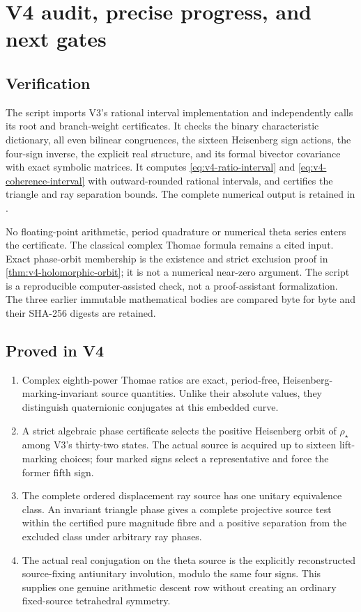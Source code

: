 \documentclass[11pt]{article}
\theoremstyle{definition}
\theoremstyle{remark}
\begin{document}
\section{V4 audit, precise progress, and next gates}
\label{sec:v4-status}

\subsection{Verification}
The script 
imports V3's rational interval implementation and independently calls its
root and branch-weight certificates. It checks the binary characteristic
dictionary, all even bilinear congruences, the sixteen Heisenberg sign
actions, the four-sign inverse, the explicit real structure, and its
formal bivector covariance with exact symbolic matrices. It computes
\eqref{eq:v4-ratio-interval} and \eqref{eq:v4-coherence-interval} with
outward-rounded rational intervals, and certifies the triangle and ray
separation bounds. The complete numerical output is retained in
.

No floating-point arithmetic, period quadrature or numerical theta series
enters the certificate. The classical complex Thomae formula remains a
cited input. Exact phase-orbit membership is the existence and strict
exclusion proof in \cref{thm:v4-holomorphic-orbit}; it is not a numerical
near-zero argument. The script is a reproducible computer-assisted check,
not a proof-assistant formalization. The three earlier immutable mathematical
bodies are compared byte for byte and their SHA-256 digests are retained.

\subsection{Proved in V4}
\begin{enumerate}[label=\textup{(P4.\arabic*)},leftmargin=3.6em]
\item Complex eighth-power Thomae ratios are exact, period-free,
      Heisenberg-marking-invariant source quantities. Unlike their absolute
      values, they distinguish quaternionic conjugates at this embedded curve.
\item A strict algebraic phase certificate selects the positive Heisenberg
      orbit of $\rho_\star$ among V3's thirty-two states. The actual source is
      acquired up to sixteen lift-marking choices; four marked signs select
      a representative and force the former fifth sign.
\item The complete ordered displacement ray source has one unitary
      equivalence class. An invariant triangle phase gives a complete
      projective source test within the certified pure magnitude fibre and
      a positive separation from the excluded class under arbitrary ray phases.
\item The actual real conjugation on the theta source is the explicitly
      reconstructed source-fixing antiunitary involution, modulo the same
      four signs. This supplies one genuine arithmetic descent row without
      creating an ordinary fixed-source tetrahedral symmetry.
\end{enumerate}
\end{document}
